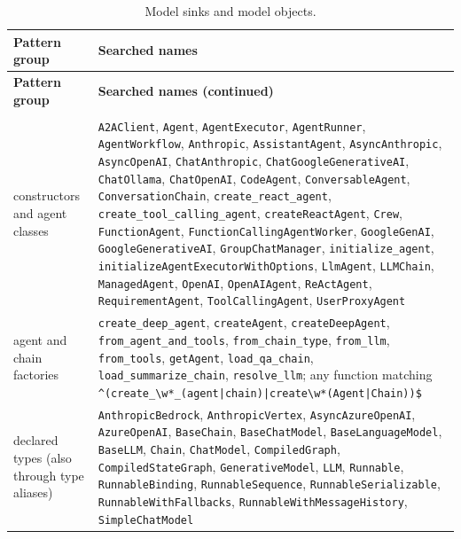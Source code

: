 {\begin{longtable}{@{}>{\raggedright\arraybackslash}p{}>{\raggedright\arraybackslash}p{}@{}}
\caption{Model sinks and model objects.}\label{tab:app-model}\\
\toprule
\textbf{Pattern group} & \textbf{Searched names} \\
\midrule
\endfirsthead
\toprule
\textbf{Pattern group} & \textbf{Searched names (continued)} \\
\midrule
\endhead
\bottomrule
\endfoot
\addlinespace[3pt]\multicolumn{2}{@{}l}{\emph{model objects}} \\
constructors and agent classes & \texttt{A2AClient}, \texttt{Agent}, \texttt{AgentExecutor}, \texttt{AgentRunner}, \texttt{AgentWorkflow}, \texttt{Anthropic}, \texttt{AssistantAgent}, \texttt{AsyncAnthropic}, \texttt{AsyncOpenAI}, \texttt{ChatAnthropic}, \texttt{ChatGoogleGenerativeAI}, \texttt{ChatOllama}, \texttt{ChatOpenAI}, \texttt{CodeAgent}, \texttt{ConversableAgent}, \texttt{ConversationChain}, \texttt{create\_react\_agent}, \texttt{create\_tool\_calling\_agent}, \texttt{createReactAgent}, \texttt{Crew}, \texttt{FunctionAgent}, \texttt{FunctionCallingAgentWorker}, \texttt{GoogleGenAI}, \texttt{GoogleGenerativeAI}, \texttt{GroupChatManager}, \texttt{initialize\_agent}, \texttt{initializeAgentExecutorWithOptions}, \texttt{LlmAgent}, \texttt{LLMChain}, \texttt{ManagedAgent}, \texttt{OpenAI}, \texttt{OpenAIAgent}, \texttt{ReActAgent}, \texttt{RequirementAgent}, \texttt{ToolCallingAgent}, \texttt{UserProxyAgent} \\
agent and chain factories & \texttt{create\_deep\_agent}, \texttt{createAgent}, \texttt{createDeepAgent}, \texttt{from\_agent\_and\_tools}, \texttt{from\_chain\_type}, \texttt{from\_llm}, \texttt{from\_tools}, \texttt{getAgent}, \texttt{load\_qa\_chain}, \texttt{load\_summarize\_chain}, \texttt{resolve\_llm}; any function matching \texttt{\textasciicircum{}(create\_\textbackslash{}w*\_(agent|chain)|create\textbackslash{}w*(Agent|Chain))\$} \\
declared types (also through type aliases) & \texttt{AnthropicBedrock}, \texttt{AnthropicVertex}, \texttt{AsyncAzureOpenAI}, \texttt{AzureOpenAI}, \texttt{BaseChain}, \texttt{BaseChatModel}, \texttt{BaseLanguageModel}, \texttt{BaseLLM}, \texttt{Chain}, \texttt{ChatModel}, \texttt{CompiledGraph}, \texttt{CompiledStateGraph}, \texttt{GenerativeModel}, \texttt{LLM}, \texttt{Runnable}, \texttt{RunnableBinding}, \texttt{RunnableSequence}, \texttt{RunnableSerializable}, \texttt{RunnableWithFallbacks}, \texttt{RunnableWithMessageHistory}, \texttt{SimpleChatModel} \\

\end{longtable}}
